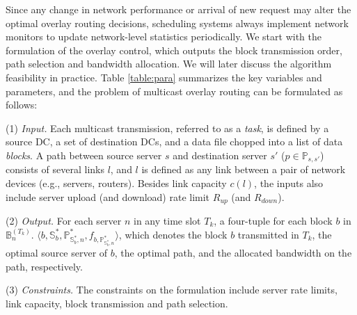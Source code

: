 Since any change in network performance or arrival of
new request may alter the optimal overlay
routing decisions, scheduling systems always implement network monitors to update network-level statistics periodically. We start with the formulation of the overlay control, which outputs the block transmission order, path selection and bandwidth allocation. We will later discuss the algorithm feasibility in practice.
Table \ref{table:para} summarizes the key variables and parameters, and the problem of multicast overlay routing can be formulated as follows:


\noindent(1) {\em Input.} %
Each multicast transmission, referred to as a {\em task}, is defined
by a source DC, a set of destination DCs, and a data file chopped into
a list of data {\em blocks}.
A path between source server $s$ and destination server $s'$ ($p\in \mathbb{P}_{s,s'}$) consists of several links $l$, and $l$ is defined as any link between a pair of network devices (e.g., servers, routers).
Besides link capacity $c(l)$, the inputs also include
server upload (and download) rate limit $R_{up}$ (and $R_{down}$).

\noindent(2) {\em Output.} For each server $n$ in any time slot $T_k$, a four-tuple for each block $b$ in $\mathbb{B}_n^{(T_k)}$. $\langle b, \mathbb{S}^*_{b}, \mathbb{P}^*_{\mathbb{S}^*_{b},n}, f_{b,\mathbb{P}^*_{\mathbb{S}^*_{b},n}} \rangle$, which denotes the block $b$ transmitted in $T_k$, the optimal source server of $b$, the optimal path, and the allocated bandwidth on the path, respectively.

\noindent(3) {\em Constraints.}
The constraints on the formulation include server rate limits, link capacity, block transmission and path selection.

